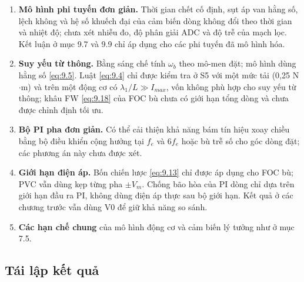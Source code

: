 \begin{enumerate}[leftmargin=*]
\item \textbf{Mô hình phi tuyến đơn giản.} Thời gian chết cố định, sụt áp van hằng số, lệch không và hệ số khuếch đại của cảm biến dòng không đổi theo thời gian và nhiệt độ; chưa xét nhiễu đo, độ phân giải ADC và độ trễ của mạch lọc. Kết luận ở mục 9.7 và 9.9 chỉ áp dụng cho các phi tuyến đã mô hình hóa.
\item \textbf{Suy yếu từ thông.} Bằng sáng chế tính $\omega_b$ theo mô-men đặt; mô hình dùng hằng số \eqref{eq:9.5}. Luật \eqref{eq:9.4} chỉ được kiểm tra ở S5 với một mức tải (0,25 N$\cdot$m) và trên một động cơ có $\lambda_1/L \gg I_{max}$, vốn không phù hợp cho suy yếu từ thông; khâu FW \eqref{eq:9.18} của FOC bù chưa có giới hạn tổng dòng và chưa được chỉnh định tối ưu.
\item \textbf{Bộ PI pha đơn giản.} Có thể cải thiện khả năng bám tín hiệu xoay chiều bằng bộ điều khiển cộng hưởng tại $f_e$ và $6f_e$ \cite{r3} hoặc bù trễ số cho góc dòng đặt; các phương án này chưa được xét.
\item \textbf{Giới hạn điện áp.} Bốn chiến lược \eqref{eq:9.13} chỉ được áp dụng cho FOC bù; PVC vẫn dùng kẹp từng pha $\pm V_m$. Chống bão hòa của PI dòng chỉ dựa trên giới hạn đầu ra PI, không dùng điện áp thực sau bộ giới hạn. Kết quả ở các chương trước vẫn dùng V0 để giữ khả năng so sánh.
\item \textbf{Các hạn chế chung} của mô hình động cơ và cảm biến lý tưởng như ở mục 7.5.
\end{enumerate}

\subsection{Tái lập kết quả}\label{sec:9.13}

